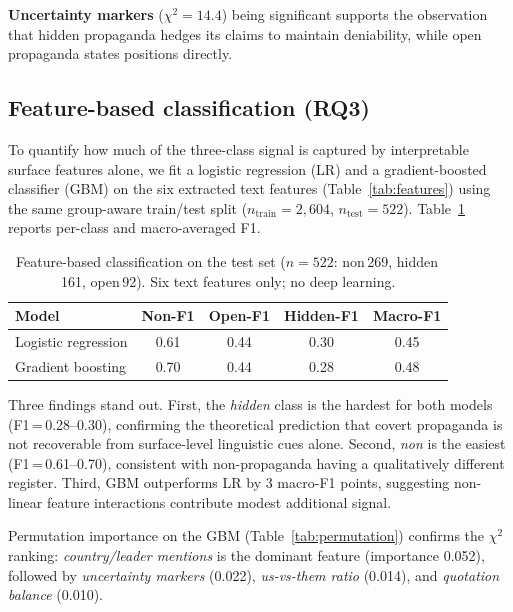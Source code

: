 \documentclass[12pt,a4paper]{article}
\begin{document}
\textbf{Uncertainty markers} ($\chi^2 = 14.4$) being significant supports the
observation that hidden propaganda hedges its claims to maintain deniability,
while open propaganda states positions directly.

\subsection{Feature-based classification (RQ3)}

To quantify how much of the three-class signal is captured by interpretable
surface features alone, we fit a logistic regression (LR) and a
gradient-boosted classifier (GBM) on the six extracted text features
(Table~\ref{tab:features}) using the same group-aware train/test split
($n_\text{train}{=}2{,}604$, $n_\text{test}{=}522$).
Table~\ref{tab:featureclf} reports per-class and macro-averaged F1.

\begin{table}[H]
\centering
\caption{Feature-based classification on the test set
($n{=}522$: non\,269, hidden\,161, open\,92).
Six text features only; no deep learning.}
\label{tab:featureclf}
\begin{tabular}{lcccc}
\toprule
Model & Non-F1 & Open-F1 & Hidden-F1 & Macro-F1 \\
\midrule
Logistic regression & 0.61 & 0.44 & 0.30 & 0.45 \\
Gradient boosting   & 0.70 & 0.44 & 0.28 & 0.48 \\
\bottomrule
\end{tabular}
\end{table}

Three findings stand out.
First, the \emph{hidden} class is the hardest for both models
(F1\,=\,0.28--0.30), confirming the theoretical prediction that covert
propaganda is not recoverable from surface-level linguistic cues alone.
Second, \emph{non} is the easiest (F1\,=\,0.61--0.70), consistent with
non-propaganda having a qualitatively different register.
Third, GBM outperforms LR by 3 macro-F1 points, suggesting non-linear
feature interactions contribute modest additional signal.

Permutation importance on the GBM (Table~\ref{tab:permutation}) confirms the
$\chi^2$ ranking: \emph{country/leader mentions} is the dominant feature
(importance 0.052), followed by \emph{uncertainty markers} (0.022),
\emph{us-vs-them ratio} (0.014), and \emph{quotation balance} (0.010).
\end{document}
